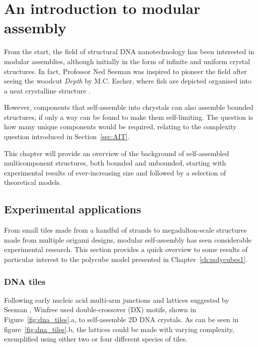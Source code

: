 
\chapter{\label{ch:polycubes_intro}An introduction to modular assembly}

\minitoc

From the start, the field of structural DNA nanotechnology has been interested in modular assemblies, although initially in the form of infinite and uniform crystal structures. In fact, Professor Ned Seeman was inspired to pioneer the field after seeing the woodcut \emph{Depth} by M.C. Escher, where fish are depicted organised into a neat crystalline structure \cite{seeman_2016}.

However, components that self-assemble into chrystals can also assemble bounded structures, if only a way can be found to make them self-limiting. The question is how many unique components would be required, relating to the complexity question introduced in Section~\ref{sec:AIT}.

This chapter will provide an overview of the background of self-assembled multicomponent structures, both bounded and unbounded, starting with experimental results of ever-increasing size and followed by a selection of theoretical models.

\section{Experimental applications} \label{sec:experimental_appl}
From small tiles made from a handful of strands to megadalton-scale structures made from multiple origami designs, modular self-assembly has seen considerable experimental research. This section provides a quick overview to some results of particular interest to the polycube model presented in Chapter~\ref{ch:polycubes1}.

\subsection{DNA tiles}
\label{sec:dna_tiles_bricks}
Following early nucleic acid multi-arm junctions and lattices suggested by Seeman \cite{seeman1982nucleic}, Winfree \cite{winfree1998algorithmic, winfree1998design} used double-crossover (DX) motifs, shown in Figure~\ref{fig:dna_tiles}.a, to self-assemble 2D DNA crystals. As can be seen in figure~\ref{fig:dna_tiles}.b, the lattices could be made with varying complexity, exemplified using either two or four different species of tiles.

